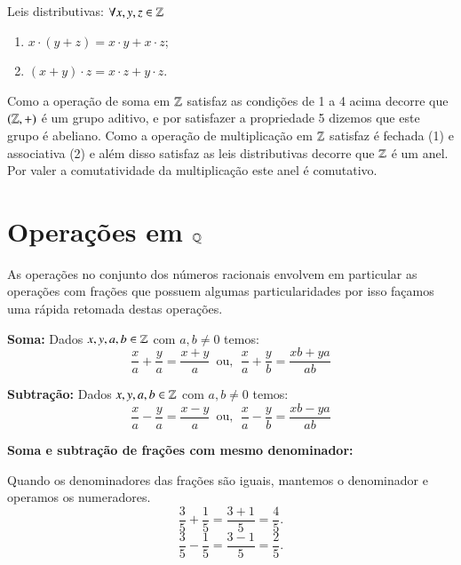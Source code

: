  Leis distributivas: $\forall x, y, z \in \mathbb{Z}$
 \begin{enumerate}[1)]
 \item $x \cdot (y + z)= x \cdot y + x \cdot z$;
 \item $(x + y) \cdot z= x \cdot z + y \cdot z$.
 \end{enumerate}

  Como a operação de soma em $\mathbb{Z}$ satisfaz as condições de 1 a 4 acima decorre que $(\mathbb{Z}, +)$ é um grupo aditivo, e por satisfazer a propriedade 5 dizemos que este grupo é abeliano. Como a operação de multiplicação em $\mathbb{Z}$ satisfaz é fechada (1) e associativa (2) e além disso satisfaz as leis distributivas decorre que $\mathbb{Z}$ é um anel. Por valer a comutatividade da multiplicação este anel é comutativo.


 \section{Operações em \texorpdfstring{$\mathbb{Q}$}{Q}}

 As operações no conjunto dos números racionais envolvem em particular as operações com frações que possuem algumas particularidades por isso façamos uma rápida retomada destas operações.

 \vskip0.3cm

 \colorbox{azul}{
 \begin{minipage}{0.9\linewidth}
 \begin{center}
  \textbf{Soma:} Dados $x, y, a, b \in \mathbb{Z}$ com $a, b \neq 0$ temos:
 \[\frac{x}{a} + \frac{y}{a}= \frac{x+y}{a} \, \text{ ou}, \ \
  \frac{x}{a} + \frac{y}{b}= \frac{xb + ya}{ab} \]
 \end{center}
 \end{minipage}}

 \vskip0.3cm

 \colorbox{azul}{
 \begin{minipage}{0.9\linewidth}
 \begin{center}
  \textbf{Subtração:} Dados $x, y, a, b \in \mathbb{Z}$ com $a, b \neq 0$ temos:
 \[\frac{x}{a} - \frac{y}{a}= \frac{x-y}{a} \, \text{ ou}, \ \
 \frac{x}{a} - \frac{y}{b}= \frac{xb - ya}{ab} \]
 \end{center}
 \end{minipage}}

 \vskip0.3cm

 \begin{exem}
  \textbf{Soma e subtração de frações com mesmo denominador:}

   Quando os denominadores das frações são iguais, mantemos o denominador e operamos os numeradores.
    \vskip0.3cm
   \[\frac{3}{5} + \frac{1}{5}= \frac{3+1}{5}= \frac{4}{5} .\]
    \vskip0.3cm
   \[\frac{3}{5} - \frac{1}{5}= \frac{3-1}{5}= \frac{2}{5} .\]
 \end{exem}

